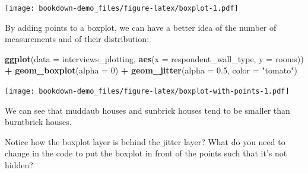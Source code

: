 \documentclass[]{book}
\newenvironment{Shaded}{\begin{snugshade}}{\end{snugshade}}
\newcommand{\KeywordTok}[1]{\textcolor[rgb]{0.13,0.29,0.53}{\textbf{#1}}}
\newcommand{\DataTypeTok}[1]{\textcolor[rgb]{0.13,0.29,0.53}{#1}}
\newcommand{\DecValTok}[1]{\textcolor[rgb]{0.00,0.00,0.81}{#1}}
\newcommand{\FloatTok}[1]{\textcolor[rgb]{0.00,0.00,0.81}{#1}}
\newcommand{\StringTok}[1]{\textcolor[rgb]{0.31,0.60,0.02}{#1}}
\newcommand{\OperatorTok}[1]{\textcolor[rgb]{0.81,0.36,0.00}{\textbf{#1}}}
\newcommand{\NormalTok}[1]{#1}
\begin{document}
\texttt{[image: bookdown-demo\_files/figure-latex/boxplot-1.pdf]}

By adding points to a boxplot, we can have a better idea of the number
of measurements and of their distribution:

\begin{Shaded}
\begin{Highlighting}[]
\KeywordTok{ggplot}\NormalTok{(}\DataTypeTok{data =}\NormalTok{ interviews_plotting, }\KeywordTok{aes}\NormalTok{(}\DataTypeTok{x =}\NormalTok{ respondent_wall_type, }\DataTypeTok{y =}\NormalTok{ rooms)) }\OperatorTok{+}
\StringTok{    }\KeywordTok{geom_boxplot}\NormalTok{(}\DataTypeTok{alpha =} \DecValTok{0}\NormalTok{) }\OperatorTok{+}
\StringTok{    }\KeywordTok{geom_jitter}\NormalTok{(}\DataTypeTok{alpha =} \FloatTok{0.5}\NormalTok{, }\DataTypeTok{color =} \StringTok{"tomato"}\NormalTok{)}
\end{Highlighting}
\end{Shaded}

\texttt{[image: bookdown-demo\_files/figure-latex/boxplot-with-points-1.pdf]}

We can see that muddaub houses and sunbrick houses tend to be smaller
than burntbrick houses.

Notice how the boxplot layer is behind the jitter layer? What do you
need to change in the code to put the boxplot in front of the points
such that it's not hidden?
\end{document}
